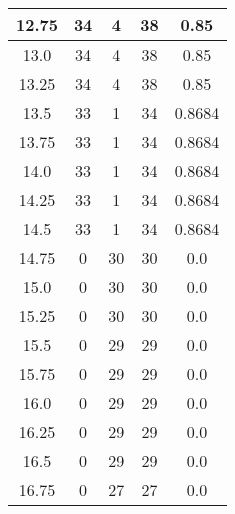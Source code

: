 \documentclass[letterpaper, 12pt]{article}
\begin{document}
\begin{longtable}{|c|c|c|c|c|}
\hline
12.75 & 34 & 4 & 38 & 0.85 \\
\hline
13.0 & 34 & 4 & 38 & 0.85 \\
\hline
13.25 & 34 & 4 & 38 & 0.85 \\
\hline
13.5 & 33 & 1 & 34 & 0.8684 \\
\hline
13.75 & 33 & 1 & 34 & 0.8684 \\
\hline
14.0 & 33 & 1 & 34 & 0.8684 \\
\hline
14.25 & 33 & 1 & 34 & 0.8684 \\
\hline
14.5 & 33 & 1 & 34 & 0.8684 \\
\hline
14.75 & 0 & 30 & 30 & 0.0 \\
\hline
15.0 & 0 & 30 & 30 & 0.0 \\
\hline
15.25 & 0 & 30 & 30 & 0.0 \\
\hline
15.5 & 0 & 29 & 29 & 0.0 \\
\hline
15.75 & 0 & 29 & 29 & 0.0 \\
\hline
16.0 & 0 & 29 & 29 & 0.0 \\
\hline
16.25 & 0 & 29 & 29 & 0.0 \\
\hline
16.5 & 0 & 29 & 29 & 0.0 \\
\hline
16.75 & 0 & 27 & 27 & 0.0 \\
\hline
\end{longtable}
\end{document}
